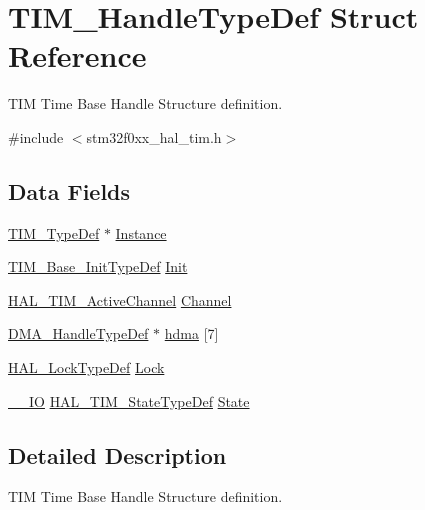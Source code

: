 \hypertarget{struct_t_i_m___handle_type_def}{}\section{T\+I\+M\+\_\+\+Handle\+Type\+Def Struct Reference}
\label{struct_t_i_m___handle_type_def}


T\+IM Time Base Handle Structure definition.  




{\ttfamily \#include $<$stm32f0xx\+\_\+hal\+\_\+tim.\+h$>$}

\subsection*{Data Fields}
\begin{DoxyCompactItemize}
\item 
\hyperlink{struct_t_i_m___type_def}{T\+I\+M\+\_\+\+Type\+Def} $\ast$ \hyperlink{struct_t_i_m___handle_type_def_a4076faade36875a6a05767135bb70b86}{Instance}
\item 
\hyperlink{struct_t_i_m___base___init_type_def}{T\+I\+M\+\_\+\+Base\+\_\+\+Init\+Type\+Def} \hyperlink{struct_t_i_m___handle_type_def_a21046dd4833b51c8e3f5c82ea134d03c}{Init}
\item 
\hyperlink{group___t_i_m___exported___types_gaa3fa7bcbb4707f1151ccfc90a8cf9706}{H\+A\+L\+\_\+\+T\+I\+M\+\_\+\+Active\+Channel} \hyperlink{struct_t_i_m___handle_type_def_a57eac61d1d06cad73bdd26dabe961753}{Channel}
\item 
\hyperlink{group___d_m_a___exported___types_ga92b907d56a9c29b93d46782a7a04f91e}{D\+M\+A\+\_\+\+Handle\+Type\+Def} $\ast$ \hyperlink{struct_t_i_m___handle_type_def_ac129fca4918fc510a515d89370aa9006}{hdma} \mbox{[}7\mbox{]}
\item 
\hyperlink{stm32f0xx__hal__def_8h_ab367482e943333a1299294eadaad284b}{H\+A\+L\+\_\+\+Lock\+Type\+Def} \hyperlink{struct_t_i_m___handle_type_def_ad4cf225029dbefe8d3fe660c33b8bb6b}{Lock}
\item 
\hyperlink{core__sc300_8h_aec43007d9998a0a0e01faede4133d6be}{\+\_\+\+\_\+\+IO} \hyperlink{group___t_i_m___exported___types_gae0994cf5970e56ca4903e9151f40010c}{H\+A\+L\+\_\+\+T\+I\+M\+\_\+\+State\+Type\+Def} \hyperlink{struct_t_i_m___handle_type_def_ad4c7388b23a70d7a1a257d6c94df29f3}{State}
\end{DoxyCompactItemize}


\subsection{Detailed Description}
T\+IM Time Base Handle Structure definition. 


